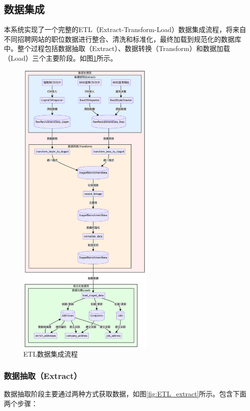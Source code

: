 \subsection{数据集成}
本系统实现了一个完整的ETL（Extract-Transform-Load）数据集成流程，将来自不同招聘网站的职位数据进行整合、清洗和标准化，最终加载到规范化的数据库中。整个过程包括数据抽取（Extract）、数据转换（Transform）和数据加载（Load）三个主要阶段。如图\ref{fig:ETL}所示。

\begin{figure}[htbp]
    \centering
    \includegraphics[width=0.6\textwidth]{figures/ETL.png}
    \caption{ETL数据集成流程}
    \label{fig:ETL}
\end{figure}

\subsubsection{数据抽取（Extract）}
数据抽取阶段主要通过两种方式获取数据，如图\ref{fig:ETL_extract}所示。包含下面两个步骤：

